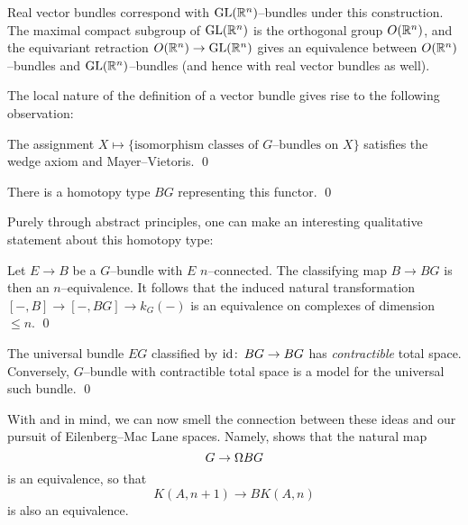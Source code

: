 \begin{example}
Real vector bundles correspond with $\mathrm{GL}(\mathbb R^n)$--bundles under this construction.
The maximal compact subgroup of $\mathrm{GL}(\mathbb R^n)$ is the orthogonal group $O(\mathbb R^n)$, and the equivariant retraction $O(\mathbb R^n) \to \mathrm{GL}(\mathbb R^n)$ gives an equivalence between $O(\mathbb R^n)$--bundles and $\mathrm{GL}(\mathbb R^n)$--bundles (and hence with real vector bundles as well).
\end{example}

The local nature of the definition of a vector bundle gives rise to the following observation:

\begin{lemma}
The assignment $X \mapsto \{\text{isomorphism classes of $G$--bundles on $X$}\}$ satisfies the wedge axiom and Mayer--Vietoris. \qed
\end{lemma}

\begin{corollary}
There is a homotopy type $BG$ representing this functor. \qed
\end{corollary}

\noindent
Purely through abstract principles, one can make an interesting qualitative statement about this homotopy type:

\begin{lemma}
Let $E \to B$ be a $G$--bundle with $E$ $n$--connected.
The classifying map $B \to BG$ is then an $n$--equivalence.
It follows that the induced natural transformation $[-, B] \to [-, BG] \to k_G(-)$ is an equivalence on complexes of dimension $\le n$.
\qed
\end{lemma}

\begin{corollary}\label{CharacterizationOfBG}
The universal bundle $EG$ classified by $\operatorname{id}\colon\thinspace BG \to BG$ has \emph{contractible} total space.
Conversely, $G$--bundle with contractible total space is a model for the universal such bundle.
\qed
\end{corollary}

\begin{remark}
With  and  in mind, we can now smell the connection between these ideas and our pursuit of Eilenberg--Mac Lane spaces.
Namely,  shows that the natural map \[G \to \Omega BG\] is an equivalence, so that \[K(A, n+1) \to BK(A, n)\] is also an equivalence.%
\end{remark}

